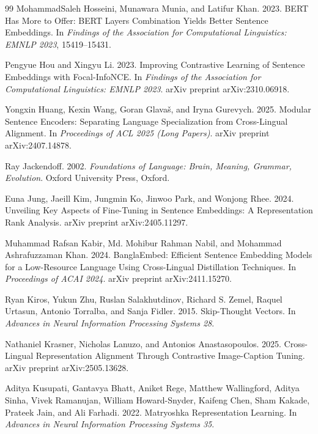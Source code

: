 \documentclass[manuscript]{acmart}
\begin{document}
\begin{thebibliography}{99}
MohammadSaleh Hosseini, Munawara Munia, and Latifur Khan. 2023.
\newblock BERT Has More to Offer: BERT Layers Combination Yields Better Sentence Embeddings.
\newblock In \emph{Findings of the Association for Computational Linguistics: EMNLP 2023}, 15419--15431.

Pengyue Hou and Xingyu Li. 2023.
\newblock Improving Contrastive Learning of Sentence Embeddings with Focal-InfoNCE.
\newblock In \emph{Findings of the Association for Computational Linguistics: EMNLP 2023}. arXiv preprint arXiv:2310.06918.

Yongxin Huang, Kexin Wang, Goran Glavaš, and Iryna Gurevych. 2025.
\newblock Modular Sentence Encoders: Separating Language Specialization from Cross-Lingual Alignment.
\newblock In \emph{Proceedings of ACL 2025 (Long Papers)}. arXiv preprint arXiv:2407.14878.

Ray Jackendoff. 2002.
\newblock \emph{Foundations of Language: Brain, Meaning, Grammar, Evolution}.
\newblock Oxford University Press, Oxford.

Euna Jung, Jaeill Kim, Jungmin Ko, Jinwoo Park, and Wonjong Rhee. 2024.
\newblock Unveiling Key Aspects of Fine-Tuning in Sentence Embeddings: A Representation Rank Analysis.
\newblock arXiv preprint arXiv:2405.11297.

Muhammad Rafsan Kabir, Md. Mohibur Rahman Nabil, and Mohammad Ashrafuzzaman Khan. 2024.
\newblock BanglaEmbed: Efficient Sentence Embedding Models for a Low-Resource Language Using Cross-Lingual Distillation Techniques.
\newblock In \emph{Proceedings of ACAI 2024}. arXiv preprint arXiv:2411.15270.

Ryan Kiros, Yukun Zhu, Ruslan Salakhutdinov, Richard S. Zemel, Raquel Urtasun, Antonio Torralba, and Sanja Fidler. 2015.
\newblock Skip-Thought Vectors.
\newblock In \emph{Advances in Neural Information Processing Systems 28}.

Nathaniel Krasner, Nicholas Lanuzo, and Antonios Anastasopoulos. 2025.
\newblock Cross-Lingual Representation Alignment Through Contrastive Image-Caption Tuning.
\newblock arXiv preprint arXiv:2505.13628.

Aditya Kusupati, Gantavya Bhatt, Aniket Rege, Matthew Wallingford, Aditya Sinha, Vivek Ramanujan, William Howard-Snyder, Kaifeng Chen, Sham Kakade, Prateek Jain, and Ali Farhadi. 2022.
\newblock Matryoshka Representation Learning.
\newblock In \emph{Advances in Neural Information Processing Systems 35}.


\end{thebibliography}
\end{document}
